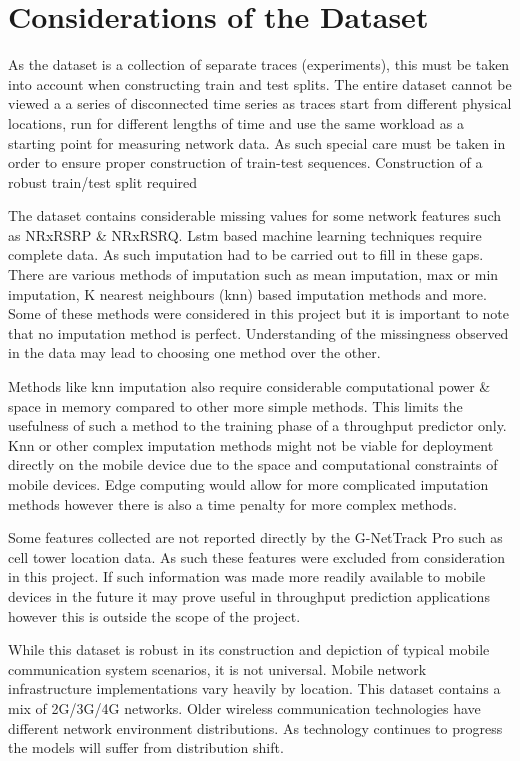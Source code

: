 \newpage
\section{Considerations of the Dataset}

As the dataset is a collection of separate traces (experiments), this must be taken into account when constructing train and test splits. The entire dataset cannot be viewed a a series of disconnected time series as traces start from different physical locations, run for different lengths of time and use the same workload as a starting point for measuring network data. As such special care must be taken in order to ensure proper construction of train-test sequences. Construction of a robust train/test split required    

The dataset contains considerable missing values for some network features such as NRxRSRP \& NRxRSRQ. Lstm based machine learning techniques require complete data. As such imputation had to be carried out to fill in these gaps. There are various methods of imputation such as mean imputation, max or min imputation, K nearest neighbours (knn) based imputation \cite{batista2002study} methods and more. Some of these methods were considered in this project but it is important to note that no imputation method is perfect. Understanding of the missingness observed in the data may lead to choosing one method over the other. 

Methods like knn imputation also require considerable computational power \& space in memory compared to other more simple methods. This limits the usefulness of such a method to the training phase of a throughput predictor only. Knn or other complex imputation methods might not be viable for deployment directly on the mobile device due to the space and computational constraints of mobile devices. Edge computing would allow for more complicated imputation methods however there is also a time penalty for more complex methods.

Some features collected are not reported directly by the G-NetTrack Pro such as cell tower location data. As such these features were excluded from consideration in this project. If such information was made more readily available to mobile devices in the future it may prove useful in throughput prediction applications however this is outside the scope of the project.

While this dataset is robust in its construction and depiction of typical mobile communication system scenarios, it is not universal. Mobile network infrastructure implementations vary heavily by location. This dataset contains a mix of 2G/3G/4G networks. Older wireless communication technologies have different network environment distributions. As technology continues to progress the models will suffer from distribution shift. 


